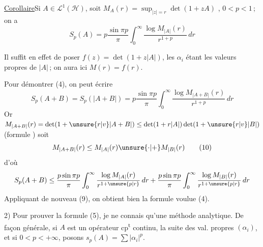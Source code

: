 \uline{Corollaire}\quad Si $A\in\mathcal L^1(\mathcal H)$, soit
$M_A(r)=\sup_{|z|=r}\det(1+zA)$
, 
  $0<p<1$\,; on a
\[
S_p(A)=p\frac{\sin\pi p}{\pi}\int_0^\infty\frac{\log M_{|A|}(r)}{r^{1+p}}\,dr\tag*{(9)}
\]

Il suffit en effet de poser $f(z)=\det(1+z|A|)$,
les $\alpha_i$ étant les valeurs propres de $|A|$\,; on aura
ici $M(r)=f(r)$.

Pour démontrer (4), on  peut écrire
\[
S_p(A+B)=S_p(|A+B|)=p\frac{\sin\pi p}{\pi}\int_0^\infty
\frac{\log M_{|A+B|}(r)}{r^{1+p}}\,dr
\]
Or $M_{|A+B|}(r)=\det(1+\unsure{r|v}|A+B|)\leq\det(1+r|A|)\det(1+\unsure{r|v}|B|)$
(formule \unsure{\ldots})  soit
\[
M_{|A+B|}(r)\leq M_{|A|}(r)\unsure{\cdot|+}M_{|B|}(r)\tag*{(10)}
\]
d'où
\[
S_p(A+B)\leq\frac{p\sin\pi p}{\pi}\int_0^\infty\frac{\log M_{|A|}(r)}{r^{1+\unsure{p|r}}}\,dr
+\frac{p\sin\pi p}{\pi}\int_0^\infty\frac{\log M_{|B|}(r)}{r^{1+\unsure{p|r}}}\,dr
\]
Appliquant de nouveau (9), on obtient bien la
formule voulue (4).


2) Pour prouver la formule (5), je ne connais
qu'une méthode analytique. De façon générale,
 si $A$ est un opérateur cp\textsuperscript{t} continu,  la
suite des val. propres $(\alpha_i)$,  et si
$0<p<+\infty$, posons $s_p(A)=\sum|\alpha_i|^p$.
